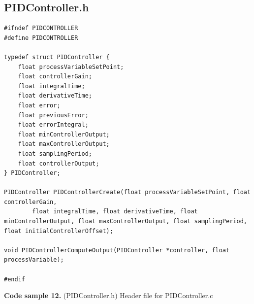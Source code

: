 \documentclass{article}
\begin{document}
\subsection{PIDController.h}
\begin{lstlisting}
#ifndef PIDCONTROLLER
#define PIDCONTROLLER

typedef struct PIDController {
	float processVariableSetPoint;
	float controllerGain;
	float integralTime;
	float derivativeTime;
	float error;
	float previousError;
	float errorIntegral;
	float minControllerOutput;
	float maxControllerOutput;
	float samplingPeriod;
	float controllerOutput;
} PIDController;

PIDController PIDControllerCreate(float processVariableSetPoint, float controllerGain,
    	float integralTime, float derivativeTime, float minControllerOutput, float maxControllerOutput, float samplingPeriod, float initialControllerOffset);

void PIDControllerComputeOutput(PIDController *controller, float processVariable);

#endif

\end{lstlisting}
\textbf{Code sample 12.} (PIDController.h) Header file for PIDController.c
\end{document}
